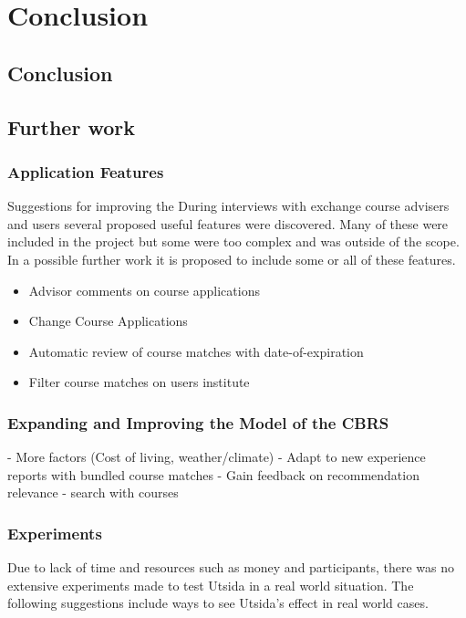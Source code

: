 
\chapter{Conclusion}


\section{Conclusion}

\section{Further work}

\subsection{Application Features}
Suggestions for improving the 
During interviews with exchange course advisers and users several proposed useful features were discovered. Many of these were included in the project but some were too complex and was outside of the scope. In a possible further work it is proposed to include some or all of these features. 


\begin{itemize}[noitemsep]
    \item Advisor comments on course applications
    \item Change Course Applications
    \item Automatic review of course matches with date-of-expiration
    \item Filter course matches on users institute
\end{itemize}

\subsection{Expanding and Improving the Model of the CBRS}
- More factors (Cost of living, weather/climate)
- Adapt to new experience reports with bundled course matches
- Gain feedback on recommendation relevance
- search with courses

\subsection{Experiments}
Due to lack of time and resources such as money and participants, there was no extensive experiments made to test Utsida in a real world situation. The following suggestions include ways to see Utsida's effect in real world cases.

